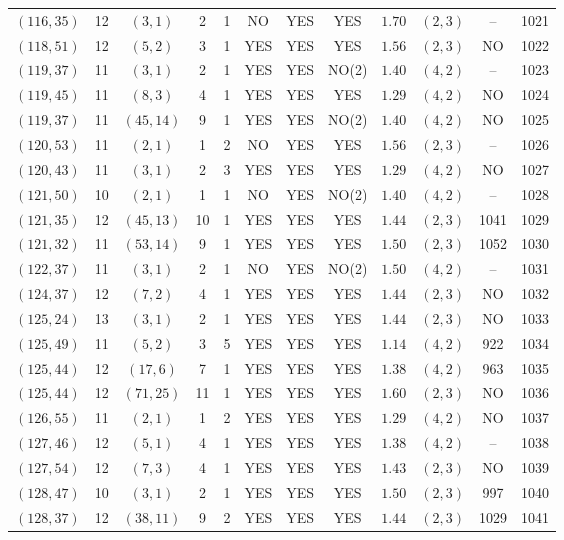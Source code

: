 \begin{longtable}{|c|c|c|c|c|c|c|c|c|c|c|c|}
$(116,35)$ & 12 & $(3,1)$ & 2 & 1 & NO & YES & YES & $1.70$ & $(2,3)$ & -- & 1021\\
$(118,51)$ & 12 & $(5,2)$ & 3 & 1 & YES & YES & YES & $1.56$ & $(2,3)$ & NO & 1022\\
$(119,37)$ & 11 & $(3,1)$ & 2 & 1 & YES & YES & NO(2) & $1.40$ & $(4,2)$ & -- & 1023\\
$(119,45)$ & 11 & $(8,3)$ & 4 & 1 & YES & YES & YES & $1.29$ & $(4,2)$ & NO & 1024\\
$(119,37)$ & 11 & $(45,14)$ & 9 & 1 & YES & YES & NO(2) & $1.40$ & $(4,2)$ & NO & 1025\\
$(120,53)$ & 11 & $(2,1)$ & 1 & 2 & NO & YES & YES & $1.56$ & $(2,3)$ & -- & 1026\\
$(120,43)$ & 11 & $(3,1)$ & 2 & 3 & YES & YES & YES & $1.29$ & $(4,2)$ & NO & 1027\\
$(121,50)$ & 10 & $(2,1)$ & 1 & 1 & NO & YES & NO(2) & $1.40$ & $(4,2)$ & -- & 1028\\
$(121,35)$ & 12 & $(45,13)$ & 10 & 1 & YES & YES & YES & $1.44$ & $(2,3)$ & 1041 & 1029\\
$(121,32)$ & 11 & $(53,14)$ & 9 & 1 & YES & YES & YES & $1.50$ & $(2,3)$ & 1052 & 1030\\
$(122,37)$ & 11 & $(3,1)$ & 2 & 1 & NO & YES & NO(2) & $1.50$ & $(4,2)$ & -- & 1031\\
$(124,37)$ & 12 & $(7,2)$ & 4 & 1 & YES & YES & YES & $1.44$ & $(2,3)$ & NO & 1032\\
$(125,24)$ & 13 & $(3,1)$ & 2 & 1 & YES & YES & YES & $1.44$ & $(2,3)$ & NO & 1033\\
$(125,49)$ & 11 & $(5,2)$ & 3 & 5 & YES & YES & YES & $1.14$ & $(4,2)$ & 922 & 1034\\
$(125,44)$ & 12 & $(17,6)$ & 7 & 1 & YES & YES & YES & $1.38$ & $(4,2)$ & 963 & 1035\\
$(125,44)$ & 12 & $(71,25)$ & 11 & 1 & YES & YES & YES & $1.60$ & $(2,3)$ & NO & 1036\\
$(126,55)$ & 11 & $(2,1)$ & 1 & 2 & YES & YES & YES & $1.29$ & $(4,2)$ & NO & 1037\\
$(127,46)$ & 12 & $(5,1)$ & 4 & 1 & YES & YES & YES & $1.38$ & $(4,2)$ & -- & 1038\\
$(127,54)$ & 12 & $(7,3)$ & 4 & 1 & YES & YES & YES & $1.43$ & $(2,3)$ & NO & 1039\\
$(128,47)$ & 10 & $(3,1)$ & 2 & 1 & YES & YES & YES & $1.50$ & $(2,3)$ & 997 & 1040\\
$(128,37)$ & 12 & $(38,11)$ & 9 & 2 & YES & YES & YES & $1.44$ & $(2,3)$ & 1029 & 1041\\

\end{longtable}
